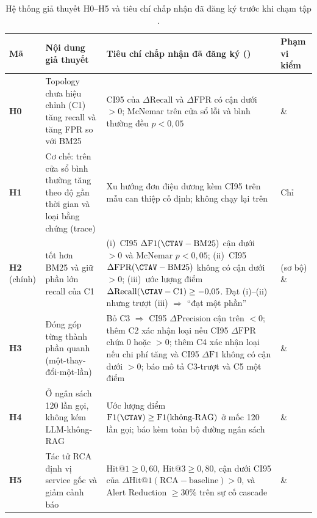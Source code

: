 \begin{table}[htbp]
  \centering
  \caption[Giả thuyết H0--H5 và tiêu chí chấp nhận đã đăng ký]{Hệ thống giả thuyết H0--H5 và tiêu chí chấp nhận đã đăng ký trước khi chạm tập .}
  \label{tab:h0-h5}
  \scriptsize
  \renewcommand{\arraystretch}{1.15}
  \setlength{\tabcolsep}{3.5pt}
  \begin{tabularx}{\linewidth}{@{}l >{\raggedright\arraybackslash}p{3.6cm} Y >{\raggedright\arraybackslash}p{2.3cm}@{}}
    \toprule
    \textbf{Mã} & \textbf{Nội dung giả thuyết} & \textbf{Tiêu chí chấp nhận đã đăng ký ()} & \textbf{Phạm vi kiểm} \\
    \midrule
    \textbf{H0} & Topology chưa hiệu chỉnh (C1) tăng recall và tăng FPR so với BM25 & CI95 của $\Delta\text{Recall}$ và $\Delta\text{FPR}$ có cận dưới $> 0$; McNemar trên cửa sổ lỗi và bình thường đều $p < 0{,}05$ &  \&  \\
    \textbf{H1} & Cơ chế:  trên cửa sổ bình thường tăng theo độ gần thời gian và loại bằng chứng (trace) & Xu hướng đơn điệu dương kèm CI95 trên mẫu can thiệp cố định; không chạy lại trên  & Chỉ  \\
    \textbf{H2} (chính) & \CTAV{} tốt hơn BM25 và giữ phần lớn recall của C1 & (i)~CI95 $\Delta\text{F1}(\text{\CTAV}-\text{BM25})$ cận dưới $> 0$ và McNemar $p < 0{,}05$; (ii)~CI95 $\Delta\text{FPR}(\text{\CTAV}-\text{BM25})$ không có cận dưới $> 0$; (iii)~ước lượng điểm $\Delta\text{Recall}(\text{\CTAV}-\text{C1}) \ge -0{,}05$. Đạt (i)--(ii) nhưng trượt (iii) $\Rightarrow$ ``đạt một phần'' &  (sơ bộ) \&  \\
    \textbf{H3} & Đóng góp từng thành phần quanh \CTAV{} (một-thay-đổi-một-lần) & Bỏ C3 $\Rightarrow$ CI95 $\Delta\text{Precision}$ cận trên $< 0$; thêm C2 xác nhận loại nếu CI95 $\Delta\text{FPR}$ chứa $0$ hoặc $> 0$; thêm C4 xác nhận loại nếu chi phí tăng và CI95 $\Delta\text{F1}$ không có cận dưới $> 0$; báo mô tả C3-trượt và C5 một điểm &  \&  \\
    \textbf{H4} & Ở ngân sách 120 lần gọi, \CTAV{} không kém LLM-không-RAG & Ước lượng điểm $\text{F1}(\text{\CTAV}) \ge \text{F1}(\text{không-RAG})$ ở mốc 120 lần gọi; báo kèm toàn bộ đường ngân sách &  \&  \\
    \textbf{H5} & Tác tử RCA định vị service gốc và giảm cảnh báo & $\text{Hit@1} \ge 0{,}60$, $\text{Hit@3} \ge 0{,}80$, cận dưới CI95 của $\Delta\text{Hit@1}(\text{RCA}-\text{baseline}) > 0$, và Alert Reduction $\ge 30\%$ trên sự cố cascade &  \&  \\
    \bottomrule
  \end{tabularx}
\end{table}

